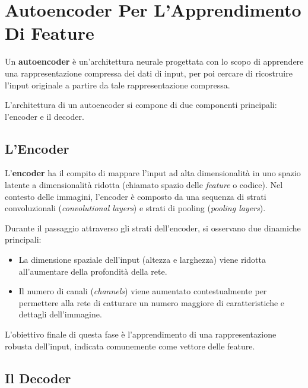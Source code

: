 ﻿\documentclass[11pt, a4paper]{article}
\begin{document}
\newpage

\section{Autoencoder Per L'Apprendimento Di Feature}

Un \textbf{autoencoder} è un'architettura neurale progettata con lo scopo di apprendere una rappresentazione compressa dei dati di input, per poi cercare di ricostruire l'input originale a partire da tale rappresentazione compressa.


L'architettura di un autoencoder si compone di due componenti principali: l'encoder e il decoder.

\subsection{L'Encoder}

L'\textbf{encoder} ha il compito di mappare l'input ad alta dimensionalità in uno spazio latente a dimensionalità ridotta (chiamato spazio delle \emph{feature} o codice). Nel contesto delle immagini, l'encoder è composto da una sequenza di strati convoluzionali (\emph{convolutional layers}) e strati di pooling (\emph{pooling layers}).

Durante il passaggio attraverso gli strati dell'encoder, si osservano due dinamiche principali:
\begin{itemize}
    \item La dimensione spaziale dell'input (altezza e larghezza) viene ridotta all'aumentare della profondità della rete.
    \item Il numero di canali (\emph{channels}) viene aumentato contestualmente per permettere alla rete di catturare un numero maggiore di caratteristiche e dettagli dell'immagine.
\end{itemize}

L'obiettivo finale di questa fase è l'apprendimento di una rappresentazione robusta dell'input, indicata comunemente come vettore delle feature.

\subsection{Il Decoder}
\end{document}
